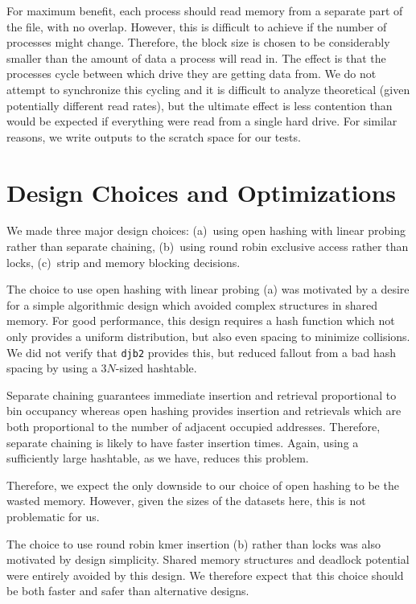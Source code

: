 \documentclass{article}
\begin{document}
For maximum benefit, each process should read memory from a separate part of the file, with no overlap. However, this is difficult to achieve if the number of processes might change. Therefore, the block size is chosen to be considerably smaller than the amount of data a process will read in. The effect is that the processes cycle between which drive they are getting data from. We do not attempt to synchronize this cycling and it is difficult to analyze theoretical (given potentially different read rates), but the ultimate effect is less contention than would be expected if everything were read from a single hard drive. For similar reasons, we write outputs to the scratch space for our tests.

\section{Design Choices and Optimizations}
We made three major design choices: (a)~using open hashing with linear probing rather than separate chaining, (b)~using round robin exclusive access rather than locks, (c)~strip and memory blocking decisions.

The choice to use open hashing with linear probing (a) was motivated by a desire for a simple algorithmic design which avoided complex structures in shared memory. For good performance, this design requires a hash function which not only provides a uniform distribution, but also even spacing to minimize collisions. We did not verify that \texttt{djb2} provides this, but reduced fallout from a bad hash spacing by using a $3N$-sized hashtable.

Separate chaining guarantees immediate insertion and retrieval proportional to bin occupancy whereas open hashing provides insertion and retrievals which are both proportional to the number of adjacent occupied addresses. Therefore, separate chaining is likely to have faster insertion times. Again, using a sufficiently large hashtable, as we have, reduces this problem.

Therefore, we expect the only downside to our choice of open hashing to be the wasted memory. However, given the sizes of the datasets here, this is not problematic for us.

The choice to use round robin kmer insertion (b) rather than locks was also motivated by design simplicity. Shared memory structures and deadlock potential were entirely avoided by this design. We therefore expect that this choice should be both faster and safer than alternative designs.
\end{document}
